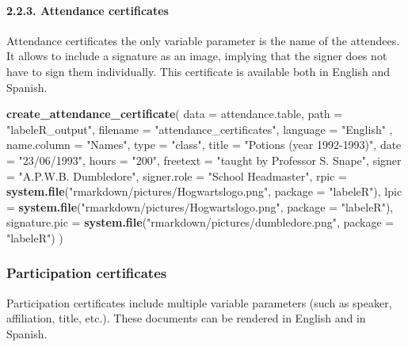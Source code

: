 \documentclass[10pt,a4paper,onecolumn]{article}
\let\oldparagraph\paragraph
\renewcommand{\paragraph}[1]{\oldparagraph{#1}\mbox{}}
\newenvironment{Shaded}{\begin{snugshade}}{\end{snugshade}}
\newcommand{\AttributeTok}[1]{\textcolor[rgb]{0.13,0.29,0.53}{#1}}
\newcommand{\FunctionTok}[1]{\textcolor[rgb]{0.13,0.29,0.53}{\textbf{#1}}}
\newcommand{\NormalTok}[1]{#1}
\newcommand{\StringTok}[1]{\textcolor[rgb]{0.31,0.60,0.02}{#1}}
\begin{document}
\paragraph{2.2.3. Attendance
certificates}\label{attendance-certificates}

Attendance certificates the only variable parameter is the name of the
attendees. It allows to include a signature as an image, implying that
the signer does not have to sign them individually. This certificate is
available both in English and Spanish.

\begin{Shaded}
\begin{Highlighting}[]
\FunctionTok{create\_attendance\_certificate}\NormalTok{(}
  \AttributeTok{data =}\NormalTok{ attendance.table,}
  \AttributeTok{path =} \StringTok{"labeleR\_output"}\NormalTok{,}
  \AttributeTok{filename =} \StringTok{"attendance\_certificates"}\NormalTok{,}
  \AttributeTok{language =} \StringTok{"English"}\NormalTok{ ,}
  \AttributeTok{name.column =} \StringTok{"Names"}\NormalTok{,}
  \AttributeTok{type =} \StringTok{"class"}\NormalTok{,}
  \AttributeTok{title =} \StringTok{"Potions (year 1992{-}1993)"}\NormalTok{,}
  \AttributeTok{date =} \StringTok{"23/06/1993"}\NormalTok{,}
  \AttributeTok{hours =} \StringTok{"200"}\NormalTok{,}
  \AttributeTok{freetext =} \StringTok{"taught by Professor S. Snape"}\NormalTok{,}
  \AttributeTok{signer =} \StringTok{"A.P.W.B. Dumbledore"}\NormalTok{,}
  \AttributeTok{signer.role =} \StringTok{"School Headmaster"}\NormalTok{,}
  \AttributeTok{rpic =} \FunctionTok{system.file}\NormalTok{(}\StringTok{"rmarkdown/pictures/Hogwartslogo.png"}\NormalTok{, }\AttributeTok{package =} \StringTok{"labeleR"}\NormalTok{),}
  \AttributeTok{lpic =} \FunctionTok{system.file}\NormalTok{(}\StringTok{"rmarkdown/pictures/Hogwartslogo.png"}\NormalTok{, }\AttributeTok{package =} \StringTok{"labeleR"}\NormalTok{),}
  \AttributeTok{signature.pic =} \FunctionTok{system.file}\NormalTok{(}\StringTok{"rmarkdown/pictures/dumbledore.png"}\NormalTok{, }\AttributeTok{package =} \StringTok{"labeleR"}\NormalTok{)}
\NormalTok{)}
\end{Highlighting}
\end{Shaded}

\subsubsection{Participation
certificates}\label{participation-certificates}

Participation certificates include multiple variable parameters (such as
speaker, affiliation, title, etc.). These documents can be rendered in
English and in Spanish.
\end{document}
